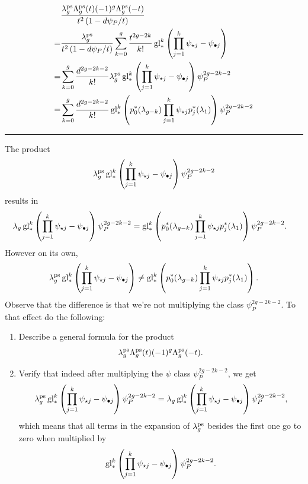 \documentclass[12pt]{memoir}
\begin{document}
\begin{align*}
      & \frac{\lambda_{g}^{\operatorname{\mathrm{ps}}}\Lambda_{g}^{\operatorname{\mathrm{ps}}}(t)(-1)^{g}\Lambda_{g}^{\operatorname{\mathrm{ps}}}(-t)}{t^2\left(1-d\psi_{P}/t\right)}                                                             \\
    = & \frac{\lambda_{g}^{\operatorname{\mathrm{ps}}}}{t^2\left(1-d\psi_{P}/t\right)}\sum_{k=0}^{g}\frac{t^{2g-2k}}{k!}\operatorname{gl}_{\ast}^k\left(\prod_{j=1}^{k}\psi_{\star j}-\psi_{\bullet j}\right) \\
    = & \sum_{k=0}^{g}\frac{d^{2g-2k-2}}{k!}\lambda_g^{\operatorname{\mathrm{ps}}}\operatorname{gl}_{\ast}^k\left(\prod_{j=1}^{k}\psi_{\star j}-\psi_{\bullet j}\right)\psi_{P}^{2g-2k-2}                     \\
    = & \sum_{k=0}^{g}\frac{d^{2g-2k-2}}{k!}\operatorname{gl}_\ast^k\left(p_0^\ast(\lambda_{g-k})\prod_{j=1}^{k}\psi_{\star j}p_j^\ast(\lambda_1)\right)\psi_{P}^{2g-2k-2}
\end{align*}
\hrule
\begin{Ej}
    The product
    \[
        \lambda_g^{\operatorname{\mathrm{ps}}}\operatorname{gl}_{\ast}^k\left(\prod_{j=1}^{k}\psi_{\star j}-\psi_{\bullet j}\right)\psi_{P}^{2g-2k-2}
    \]
    results in
    \begin{align*}
         & \lambda_g\operatorname{gl}_{\ast}^k\left(\prod_{j=1}^{k}\psi_{\star j}-\psi_{\bullet j}\right)\psi_{P}^{2g-2k-2}=\operatorname{gl}_\ast^k\left(p_0^\ast(\lambda_{g-k})\prod_{j=1}^{k}\psi_{\star j}p_j^\ast(\lambda_1)\right)\psi_{P}^{2g-2k-2}.
    \end{align*}
    However on its own,
    \[    \lambda_g^{\operatorname{\mathrm{ps}}}\operatorname{gl}_{\ast}^k\left(\prod_{j=1}^{k}\psi_{\star j}-\psi_{\bullet j}\right)\neq\operatorname{gl}_\ast^k\left(p_0^\ast(\lambda_{g-k})\prod_{j=1}^{k}\psi_{\star j}p_j^\ast(\lambda_1)\right).
    \]
    Observe that the difference is that we're not multiplying the class \(\psi_{P}^{2g-2k-2}\).
    To that effect do the following:

    \begin{enumerate}
        \item Describe a general formula for the product
              \[
                  \lambda_{g}^{\operatorname{\mathrm{ps}}}\Lambda_{g}^{\operatorname{\mathrm{ps}}}(t)(-1)^{g}\Lambda_{g}^{\operatorname{\mathrm{ps}}}(-t).
              \]
        \item Verify that indeed after multiplying the \(\psi\) class \(\psi_{P}^{2g-2k-2}\), we get
              \[
                  \lambda_g^{\operatorname{\mathrm{ps}}}\operatorname{gl}_{\ast}^k\left(\prod_{j=1}^{k}\psi_{\star j}-\psi_{\bullet j}\right)\psi_{P}^{2g-2k-2}=\lambda_g\operatorname{gl}_{\ast}^k\left(\prod_{j=1}^{k}\psi_{\star j}-\psi_{\bullet j}\right)\psi_{P}^{2g-2k-2},
              \]
              which means that all terms in the expansion of \(\lambda_g^{\operatorname{\mathrm{ps}}}\) besides the first one go to zero when multiplied by
              \[
                  \operatorname{gl}_{\ast}^k\left(\prod_{j=1}^{k}\psi_{\star j}-\psi_{\bullet j}\right)\psi_{P}^{2g-2k-2}.
              \]
    \end{enumerate}

\end{Ej}
\end{document}
